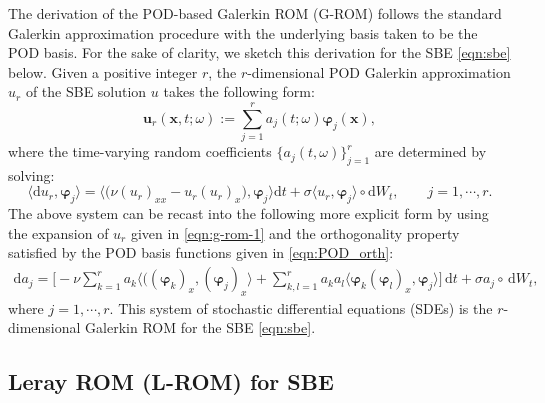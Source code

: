 \documentclass[11pt]{amsart}
\numberwithin{equation}{section}
\def\d{\, \mathrm{d}}
\def\be{\begin{equation}}
\def\ee{\end{equation}}
\def\bea{\begin{equation} \begin{aligned}}
\def\eea{\end{aligned} \end{equation}}
\newcommand{\bu}{\boldsymbol{u}}
\newcommand{\bx}{\boldsymbol{x}}
\newcommand{\bphi}{\boldsymbol{\varphi}}
\begin{document}
The derivation of the POD-based Galerkin ROM (G-ROM) follows the standard Galerkin approximation procedure with the underlying basis taken to be the POD basis. For the sake of clarity, we sketch this derivation for the SBE \eqref{eqn:sbe} below.  
 Given a positive integer $r$, the $r$-dimensional POD Galerkin approximation $u_r$ of the SBE solution $u$ takes the following form:
\begin{equation}    
	{\bu}_r(\bx,t; \omega) 
 	:= \sum_{j=1}^r a_j(t; \omega) \bphi_j(\bx),
	\label{eqn:g-rom-1}
\end{equation} 
where the time-varying random coefficients $\{a_{j}(t, \omega)\}_{j=1}^{r}$ are determined by solving:
\be  \label{eqn:g-rom-1b}
\big \langle \mathrm{d} u_r, \bphi_j \big \rangle  = \big \langle \big( \nu (u_r)_{xx}  - u_r  (u_r)_x\big), \bphi_j \big \rangle \mathrm{d} t + \sigma \langle u_r, \bphi_j \rangle  \circ \mathrm{d}W_t, \qquad j = 1, \cdots, r.
\ee 
The above system can be recast into the following more explicit form by using the expansion of $u_r$ given in \eqref{eqn:g-rom-1} and the orthogonality property satisfied by the POD basis functions given in \eqref{eqn:POD_orth}:
\bea \label{eqn:g-rom-2}
\mathrm{d} a_j = \Big [ - \nu  \sum_{k = 1}^r  a_k \big \langle \big( (\bphi_k)_{x}, (\bphi_j)_{x} \big \rangle   + \sum_{k,l = 1}^r a_k a_l   \big \langle \bphi_k (\bphi_l)_x, \bphi_j \big \rangle \Big] \d t + \sigma a_j  \circ \d W_t,
\eea
where $j = 1, \cdots, r$. This system of stochastic differential equations (SDEs) is the $r$-dimensional Galerkin ROM for the SBE \eqref{eqn:sbe}.




\subsection{Leray ROM (L-ROM) for SBE}
	\label{sec:l-rom}
\end{document}

